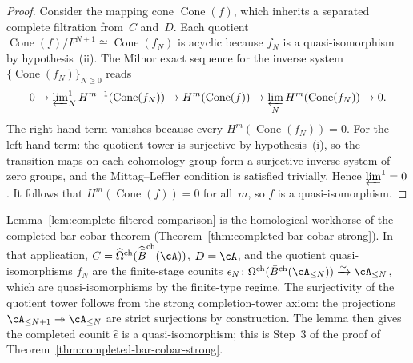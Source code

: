 \begin{proof}
Consider the mapping cone $\operatorname{Cone}(f)$, which inherits a
separated complete filtration from~$C$ and~$D$. Each quotient
$\operatorname{Cone}(f)/F^{N+1} \cong \operatorname{Cone}(f_N)$ is
acyclic because $f_N$ is a quasi-isomorphism by hypothesis~(ii).
The Milnor exact sequence for the inverse system
$\{\operatorname{Cone}(f_N)\}_{N \ge 0}$ reads
\[
0 \to \varprojlim\nolimits^1_N
 H^{m-1}(\operatorname{Cone}(f_N))
\to H^m(\operatorname{Cone}(f))
\to \varprojlim_N H^m(\operatorname{Cone}(f_N)) \to 0.
\]
The right-hand term vanishes because every
$H^m(\operatorname{Cone}(f_N)) = 0$. For the left-hand term: the
quotient tower is surjective by hypothesis~(i), so the transition maps
on each cohomology group form a surjective inverse system of zero
groups, and the Mittag--Leffler condition is satisfied trivially.
Hence $\varprojlim^1 = 0$. It follows that
$H^m(\operatorname{Cone}(f)) = 0$ for all~$m$, so $f$ is a
quasi-isomorphism.
\end{proof}

\begin{remark}
\label{rem:complete-filtered-comparison-role}
Lemma~\ref{lem:complete-filtered-comparison} is the homological
workhorse of the completed bar-cobar theorem
(Theorem~\ref{thm:completed-bar-cobar-strong}). In that application,
$C = \widehat\Omega^{\mathrm{ch}}(\widehat{\bar B}^{\mathrm{ch}}(\cA))$,
$D = \cA$, and the quotient quasi-isomorphisms $f_N$ are the
finite-stage counits
$\epsilon_N\colon \Omega^{\mathrm{ch}}(\bar B^{\mathrm{ch}}(\cA_{\le N}))
\xrightarrow{\sim} \cA_{\le N}$, which are quasi-isomorphisms by the
finite-type regime. The surjectivity of the quotient tower follows from
the strong completion-tower axiom: the projections
$\cA_{\le N+1} \twoheadrightarrow \cA_{\le N}$ are strict surjections
by construction. The lemma then gives the completed counit
$\widehat\epsilon$ is a quasi-isomorphism; this is Step~3 of the proof of
Theorem~\ref{thm:completed-bar-cobar-strong}.
\end{remark}

